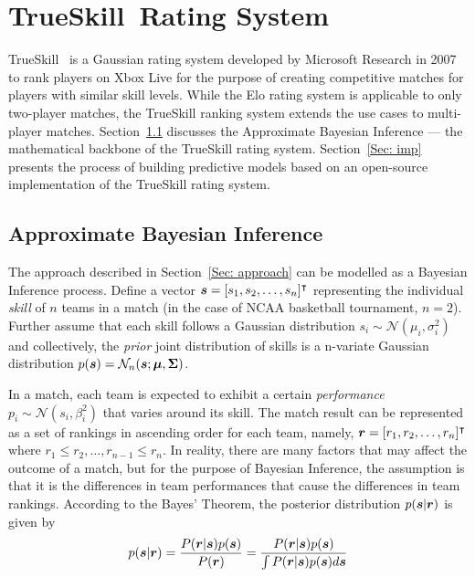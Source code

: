 \chapter{TrueSkill\texttrademark~Rating System}\label{Chap:3}
TrueSkill~\cite{TS07} is a Gaussian rating system developed by Microsoft Research in 2007 to rank players on Xbox Live for the purpose of creating competitive matches for players with similar skill levels. While the Elo rating system is applicable to only two-player matches, the TrueSkill ranking system extends the use cases to multi-player matches. Section~\ref{Sec: tmm} discusses the Approximate Bayesian Inference --- the mathematical backbone of the TrueSkill rating system. Section~\ref{Sec: imp} presents the process of building predictive models based on an open-source implementation of the TrueSkill rating system. 

\section{Approximate Bayesian Inference}\label{Sec: tmm}

The approach described in Section~\ref{Sec: approach} can be modelled as a Bayesian Inference process. Define a vector $\bm{s}  = [s_{1}, s_{2}, \ldots, s_{n}]^{\intercal}$ representing the individual \emph{skill} of $n$ teams in a match (in the case of NCAA basketball tournament, $n = 2$). Further assume that each skill follows a Gaussian distribution $s_{i} \sim \mathcal{N}(\mu_{i}, \sigma_{i}^{2})$ and collectively, the \emph{prior} joint distribution of skills is a n-variate Gaussian distribution $p(\bm{s}) = \mathcal{N}_{n}(\bm{s}; \bm{\mu}, \bm{\Sigma})$.

In a match, each team is expected to exhibit a certain \emph{performance} $p_{i} \sim \mathcal{N}(s_{i}, \beta_{i}^{2})$ that varies around its skill. The match result can be represented as a set of rankings in ascending order for each team, namely, $\bm{r} = [r_{1}, r_{2}, \ldots, r_{n}]^{\intercal}$ where $r_{1} \leq r_{2}, \ldots, r_{n - 1} \leq r_{n}$. In reality, there are many factors that may affect the outcome of a match, but for the purpose of Bayesian Inference, the assumption is that it is the differences in team performances that cause the differences in team rankings. According to the Bayes' Theorem, the posterior distribution $p(\bm{s} | \bm{r})$ is given by
\begin{equation}\label{Eqn: bayes}
p(\bm{s} | \bm{r}) = \frac{P(\bm{r} | \bm{s})p(\bm{s})}{P(\bm{r})} = \frac{P(\bm{r} | \bm{s})p(\bm{s})}{\int P(\bm{r} | \bm{s})p(\bm{s})d\bm{s}}
\end{equation}

